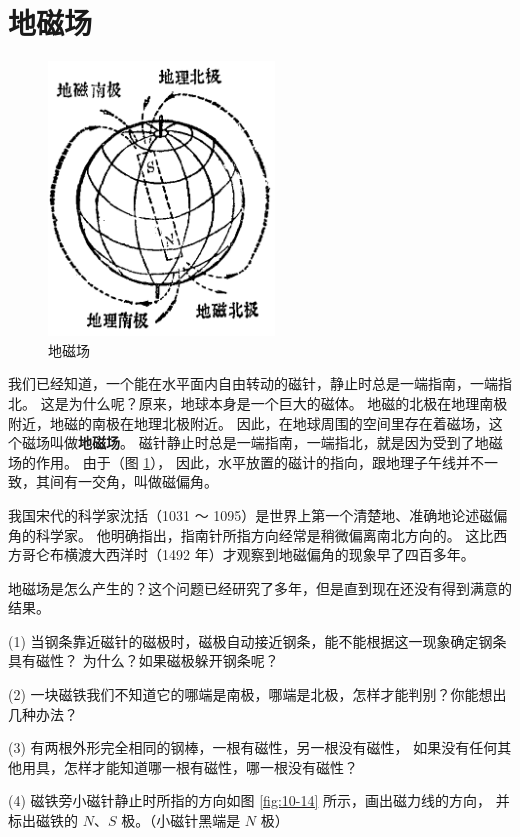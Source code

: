 \section{地磁场}\label{sec:10-3}

\begin{figure}
    \centering
    \includegraphics[width=6cm]{../pic/czwl2-ch10-13}
    \caption{地磁场}\label{fig:10-13}
\end{figure}

我们已经知道，一个能在水平面内自由转动的磁针，静止时总是一端指南，一端指北。
这是为什么呢？原来，地球本身是一个巨大的磁体。
地磁的北极在地理南极附近，地磁的南极在地理北极附近。
因此，在地球周围的空间里存在着磁场，这个磁场叫做\textbf{地磁场}。
磁针静止时总是一端指南，一端指北，就是因为受到了地磁场的作用。
由于（图 \ref{fig:10-13}），
因此，水平放置的磁计的指向，跟地理子午线并不一致，其间有一交角，叫做磁偏角。

我国宋代的科学家沈括（1031 ～ 1095）是世界上第一个清楚地、准确地论述磁偏角的科学家。
他明确指出，指南针所指方向经常是稍微偏离南北方向的。
这比西方哥仑布横渡大西洋时（1492 年）才观察到地磁偏角的现象早了四百多年。

地磁场是怎么产生的？这个问题已经研究了多年，但是直到现在还没有得到满意的结果。


\lianxi

(1) 当钢条靠近磁针的磁极时，磁极自动接近钢条，能不能根据这一现象确定钢条具有磁性？
为什么？如果磁极躲开钢条呢？

(2) 一块磁铁我们不知道它的哪端是南极，哪端是北极，怎样才能判别？你能想出几种办法？

(3) 有两根外形完全相同的钢棒，一根有磁性，另一根没有磁性，
如果没有任何其他用具，怎样才能知道哪一根有磁性，哪一根没有磁性？


(4) 磁铁旁小磁针静止时所指的方向如图 \ref{fig:10-14} 所示，画出磁力线的方向，
并标出磁铁的 $N$、$S$ 极。（小磁针黑端是 $N$ 极）

